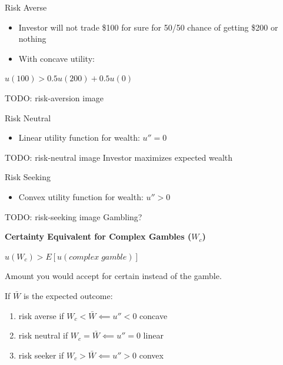 \documentclass[
14pt,notheorems,hyperref={pdfauthor=whatever}
]{beamer}
\begin{document}
\begin{frame}
Risk Averse\\
\hfill \break
\begin{itemize}
    \item Investor will not trade \$100 for sure for 50/50 chance of getting \$200 or nothing
    \item With concave utility:
\end{itemize}
\begin{center}
    $u(100) > 0.5 u(200) + 0.5 u(0)$\\
\end{center}
TODO: risk-aversion image
\end{frame}

\begin{frame}
Risk Neutral\\
\hfill \break
\begin{itemize}
    \item Linear utility function for wealth: $u''=0$
\end{itemize}
TODO: risk-neutral image
\hfill \break
Investor maximizes expected wealth\\
\end{frame}

\begin{frame}
Risk Seeking\\
\hfill \break
\begin{itemize}
    \item Convex utility function for wealth: $u''>0$
\end{itemize}
TODO: risk-seeking image
\hfill \break
Gambling?\\
\end{frame}

\begin{frame}
\textbf{Certainty Equivalent for Complex Gambles ($W_c$)}\\
\begin{center}
    $u(W_c) > E[u(complex\;gamble)]$\\
\end{center}
\begin{center}
    Amount you would accept for certain instead of the gamble.
\end{center}
\hfill \break
If $\bar{W}$ is the expected outcome:\\
\begin{enumerate}
\setlength{\itemindent}{.5in}
    \item risk averse if $W_c < \bar{W} \impliedby u''<0$  concave
    \item risk neutral if $W_c = \bar{W} \impliedby u''=0$  linear
    \item risk seeker if $W_c > \bar{W} \impliedby u''>0$  convex
\end{enumerate}
\end{frame}
\end{document}
